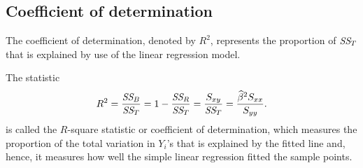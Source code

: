 \subsection{Coefficient of determination}

The coefficient of determination, denoted by $R^2$, represents the proportion of $\textit{SS}_{T}$ that is explained by use of the 
linear regression model.
\begin{definition}[R-square]
    The statistic
    \begin{equation}
        R^2 = \frac{\textit{SS}_{B}}{\textit{SS}_{T}} = 1 - \frac{\textit{SS}_{R}}{\textit{SS}_{T}} 
        = \frac{S_{xy}}{\textit{SS}_{T}}
        = \frac{\widehat{\beta}^2 S_{xx}}{S_{yy}}.
    \end{equation}
    is called the $R$-square statistic or coefficient of determination, which 
    measures the proportion of the total variation in $Y_i$'s that is explained 
    by the fitted line and, hence, it measures how well the simple linear regression 
    fitted the sample points.
\end{definition}

